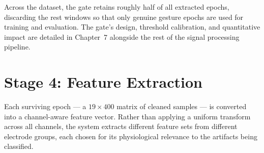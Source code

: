 Across the dataset, the gate retains roughly half of all extracted
epochs, discarding the rest windows so that only genuine gesture
epochs are used for training and evaluation. The gate's design,
threshold calibration, and quantitative impact are detailed in
Chapter~7 alongside the rest of the signal processing pipeline.

\section{Stage 4: Feature Extraction}
\label{sec:mo_features}

Each surviving epoch --- a $19 \times 400$ matrix of cleaned samples
--- is converted into a channel-aware feature vector. Rather
than applying a uniform transform across all channels, the system
extracts different feature sets from different electrode groups,
each chosen for its physiological relevance to the artifacts being
classified.

